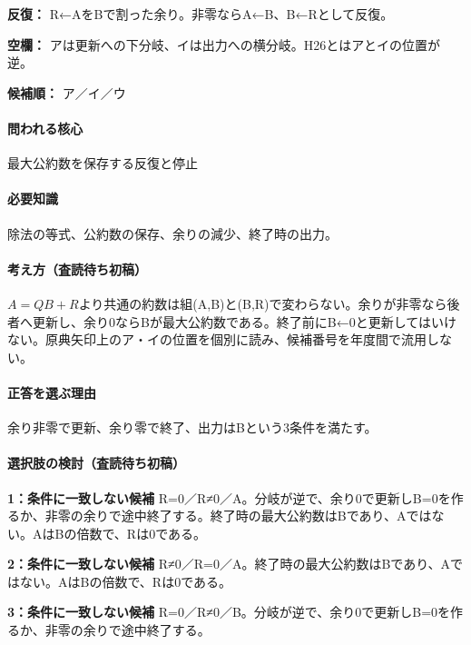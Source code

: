 \noindent\textbf{反復：} R←AをBで割った余り。非零ならA←B、B←Rとして反復。\par

\noindent\textbf{空欄：} アは更新への下分岐、イは出力への横分岐。H26とはアとイの位置が逆。\par

\noindent\textbf{候補順：} ア／イ／ウ\par

\paragraph{問われる核心} 最大公約数を保存する反復と停止

\paragraph{必要知識} 除法の等式、公約数の保存、余りの減少、終了時の出力。

\paragraph{考え方（査読待ち初稿）} \(A=QB+R\)より共通の約数は組(A,B)と(B,R)で変わらない。余りが非零なら後者へ更新し、余り0ならBが最大公約数である。終了前にB←0と更新してはいけない。原典矢印上のア・イの位置を個別に読み、候補番号を年度間で流用しない。

\paragraph{正答を選ぶ理由} 余り非零で更新、余り零で終了、出力はBという3条件を満たす。

\paragraph{選択肢の検討（査読待ち初稿）}\mbox{}\par

\noindent\textbf{1：条件に一致しない候補} R=\allowbreak{}0／R≠0／A。分岐が逆で、余り0で更新しB=\allowbreak{}0を作るか、非零の余りで途中終了する。終了時の最大公約数はBであり、Aではない。AはBの倍数で、Rは0である。\par

\noindent\textbf{2：条件に一致しない候補} R≠0／R=\allowbreak{}0／A。終了時の最大公約数はBであり、Aではない。AはBの倍数で、Rは0である。\par

\noindent\textbf{3：条件に一致しない候補} R=\allowbreak{}0／R≠0／B。分岐が逆で、余り0で更新しB=\allowbreak{}0を作るか、非零の余りで途中終了する。\par

